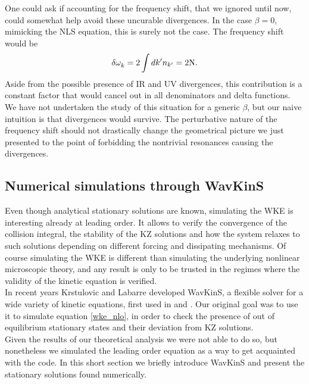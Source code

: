     One could ask if accounting for the frequency shift, that we ignored until now, could somewhat help avoid these uncurable divergences. In the case
    $\beta = 0$, mimicking the NLS equation, this is surely not the case. The frequency shift would be
    \begin{equation}
        \delta \omega^{}_k = 2\int dk' n_{k'} = 2 \mathrm{N}.
    \end{equation}
    Aside from the possible presence of IR and UV divergences, this contribution is a constant factor that would cancel out in all denominators and delta functions.\\
    We have not undertaken the study of this situation for a generic $\beta$, but our naive intuition is that divergences would survive. The perturbative nature of the frequency shift should not drastically change the geometrical picture we just presented to the point of forbidding the nontrivial resonances causing the divergences.\\
    \subsection{Numerical simulations through WavKinS}

    Even though analytical stationary solutions are known, simulating the WKE is interesting already at leading order. It allows to verify the convergence of the collision integral, the stability of the KZ solutions and how the system relaxes to such solutions depending on different forcing and dissipating mechanisms. Of course simulating the WKE is different than simulating the underlying nonlinear microscopic theory, and any result is only to be trusted in the regimes where the validity of the kinetic equation is verified. \\

    In recent years Krstulovic and Labarre developed WavKinS, a flexible solver for a wide variety of kinetic equations, first used in \cite{Giorgio1} and \cite{Giorgio2}. Our original goal was to use it to 
    simulate equation \eqref{wke_nlo}, in order to check the presence of out of equilibrium stationary states and their deviation from KZ solutions.\\
    Given the results of our theoretical analysis we were not able to do so, but nonetheless we simulated the leading order equation as a way to get acquainted with the code. In this short section we briefly introduce WavKinS and present the stationary solutions found numerically. \\
    
